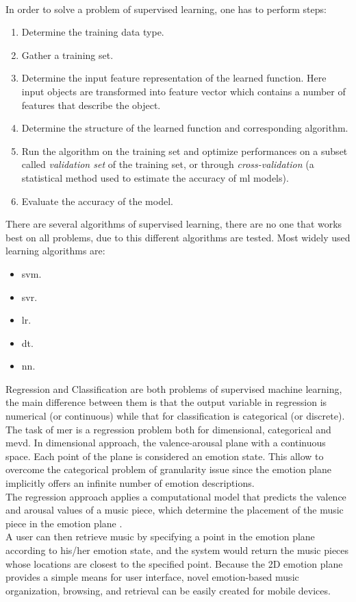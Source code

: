 \\
In order to solve a problem of supervised learning, one has to perform steps:
\begin{enumerate}
	\item Determine the training data type.
	\item Gather a training set.
	\item Determine the input feature representation of the learned function. Here input objects are transformed into feature vector which contains a number of features that describe the object.
	\item Determine the structure of the learned function and corresponding algorithm.
	\item Run the algorithm on the training set and optimize performances on a subset called \textit{validation set} of the training set, or through \textit{cross-validation} (a statistical method used to estimate the accuracy of \gls{ml} models).
	\item Evaluate the accuracy of the model.
\end{enumerate}
There are several algorithms of supervised learning, there are no one that works best on all problems, due to this different algorithms are tested. Most widely used learning algorithms are:
\begin{itemize}
	\item \gls{svm}.
	\item \gls{svr}.
	\item \gls{lr}.
	\item \gls{dt}.
	\item \gls{nn}.
\end{itemize}
Regression and Classification are both problems of supervised machine learning, the main difference between them is that the output variable in regression is numerical (or continuous) while that for classification is categorical (or discrete).
\\ \indent
The task of \gls{mer} is a regression problem both for dimensional, categorical and \gls{mevd}. In dimensional approach, the valence-arousal plane with a continuous space. Each point of the plane is considered an emotion state. This allow to overcome the categorical problem of granularity issue since the emotion plane implicitly offers an infinite number of emotion descriptions.
\\
The regression approach applies a computational model that predicts the valence and arousal values of a music piece, which determine the placement of the music piece in the emotion plane \cite{yang2011music}.
\\ \indent
A user can then retrieve music by specifying a point in the emotion plane according to his/her emotion state, and the system would return the music pieces whose locations are closest to the specified point. Because the 2D emotion plane provides a simple means for user interface, novel emotion-based music organization, browsing, and retrieval can be easily created for mobile devices.

